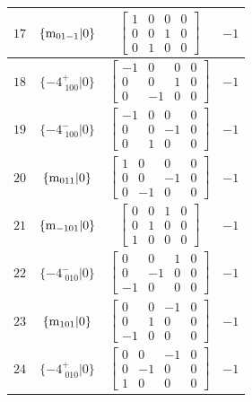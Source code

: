 \documentclass[fleqn,8pt]{jsarticle}
\begin{document}
\begin{longtable}{cccc}
$ 17 $ & $ \{{\rm m}_{01-1}|0\} $ & $ \begin{bmatrix} 1 & 0 & 0 & 0 \\ 0 & 0 & 1 & 0 \\ 0 & 1 & 0 & 0 \end{bmatrix} $ & $ -1 $ \\ \hline
$ 18 $ & $ \{-4^{+}_{\,\,100}|0\} $ & $ \begin{bmatrix} -1 & 0 & 0 & 0 \\ 0 & 0 & 1 & 0 \\ 0 & -1 & 0 & 0 \end{bmatrix} $ & $ -1 $ \\ \hline
$ 19 $ & $ \{-4^{-}_{\,\,100}|0\} $ & $ \begin{bmatrix} -1 & 0 & 0 & 0 \\ 0 & 0 & -1 & 0 \\ 0 & 1 & 0 & 0 \end{bmatrix} $ & $ -1 $ \\ \hline
$ 20 $ & $ \{{\rm m}_{011}|0\} $ & $ \begin{bmatrix} 1 & 0 & 0 & 0 \\ 0 & 0 & -1 & 0 \\ 0 & -1 & 0 & 0 \end{bmatrix} $ & $ -1 $ \\ \hline
$ 21 $ & $ \{{\rm m}_{-101}|0\} $ & $ \begin{bmatrix} 0 & 0 & 1 & 0 \\ 0 & 1 & 0 & 0 \\ 1 & 0 & 0 & 0 \end{bmatrix} $ & $ -1 $ \\ \hline
$ 22 $ & $ \{-4^{-}_{\,\,010}|0\} $ & $ \begin{bmatrix} 0 & 0 & 1 & 0 \\ 0 & -1 & 0 & 0 \\ -1 & 0 & 0 & 0 \end{bmatrix} $ & $ -1 $ \\ \hline
$ 23 $ & $ \{{\rm m}_{101}|0\} $ & $ \begin{bmatrix} 0 & 0 & -1 & 0 \\ 0 & 1 & 0 & 0 \\ -1 & 0 & 0 & 0 \end{bmatrix} $ & $ -1 $ \\ \hline
$ 24 $ & $ \{-4^{+}_{\,\,010}|0\} $ & $ \begin{bmatrix} 0 & 0 & -1 & 0 \\ 0 & -1 & 0 & 0 \\ 1 & 0 & 0 & 0 \end{bmatrix} $ & $ -1 $ \\
\end{longtable}
\end{document}
